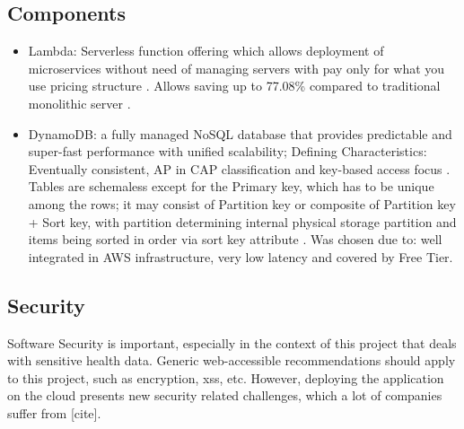 \subsection{Components}
\begin{itemize}
    \item Lambda: Serverless function offering which allows deployment of microservices without need of managing servers with pay only for what you use pricing structure \cite{LambdaCostSave}. Allows saving up to 77.08\% compared to traditional monolithic server \cite{LambdaCostSave}.
    \item DynamoDB: a fully managed NoSQL database that provides predictable and super-fast performance with unified scalability; Defining Characteristics: Eventually consistent, AP in CAP classification and key-based access focus \cite{DynamoDB}. Tables are schemaless except for the Primary key, which has to be unique among the rows; it may consist of Partition key or composite of Partition key + Sort key, with partition determining internal physical storage partition and items being sorted in order via sort key attribute \cite{awsDynamoWebsite}. Was chosen due to: well integrated in AWS infrastructure, very low latency and covered by Free Tier.
\end{itemize}
\subsection{Security}
Software Security is important, especially in the context of this project that deals with sensitive health data. Generic web-accessible recommendations should apply to this project, such as encryption, xss, etc. However, deploying the application on the cloud presents new security related challenges, which a lot of companies suffer from [cite]. 
